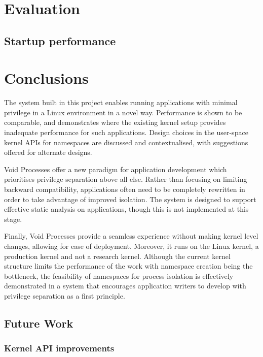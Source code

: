 \documentclass[12pt,a4paper,twoside]{report}
\begin{document}
\chapter{Evaluation}
\label{chap:evaluation}


\section{Startup performance}
\label{sec:evaluation-startup-perf}



\chapter{Conclusions}
\label{chap:conclusions}

The system built in this project enables running applications with minimal privilege in a Linux environment in a novel way. Performance is shown to be comparable, and demonstrates where the existing kernel setup provides inadequate performance for such applications. Design choices in the user-space kernel APIs for namespaces are discussed and contextualised, with suggestions offered for alternate designs.

Void Processes offer a new paradigm for application development which prioritises privilege separation above all else. Rather than focusing on limiting backward compatibility, applications often need to be completely rewritten in order to take advantage of improved isolation. The system is designed to support effective static analysis on applications, though this is not implemented at this stage.

Finally, Void Processes provide a seamless experience without making kernel level changes, allowing for ease of deployment. Moreover, it runs on the Linux kernel, a production kernel and not a research kernel. Although the current kernel structure limits the performance of the work with namespace creation being the bottleneck, the feasibility of namespaces for process isolation is effectively demonstrated in a system that encourages application writers to develop with privilege separation as a first principle.

\section{Future Work}

\subsection{Kernel API improvements}
\end{document}
